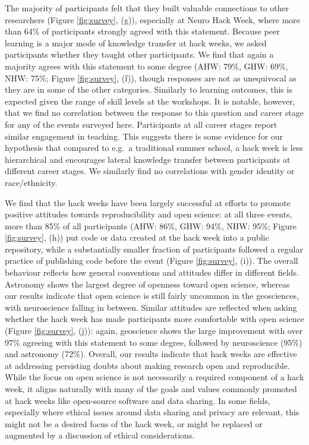The majority of participants felt that they built valuable connections to other researchers (Figure \ref{fig:survey}, (g)), especially at Neuro Hack Week, where more than 64\% of participants strongly agreed with this statement.
Because peer learning is a major mode of knowledge transfer at hack weeks, we asked participants whether they taught other participants.
We find that again a majority agrees with this statement to some degree (AHW: 79\%, GHW: 69\%, NHW: 75\%; Figure \ref{fig:survey}, (f)), though responses are not as unequivocal as they are in some of the other categories.
Similarly to learning outcomes, this is expected given the range of skill levels at the workshops. It is notable, however, that we find no correlation between the response to this question and career stage for any of the events surveyed here. Participants at all career stages report similar engagement in teaching. This suggests there is some evidence for our hypothesis that compared to e.g.\ a traditional summer school, a hack week is less hierarchical and encourages lateral knowledge transfer between participants at different career stages.  We similarly find no correlations with gender identity or race/ethnicity.

We find that the hack weeks have been largely successful at efforts to promote positive attitudes towards reproducibility and open science: at all three events, more than 85\% of all participants (AHW: 86\%, GHW: 94\%, NHW: 95\%; Figure \ref{fig:survey}, (h)) put code or data created at the hack week into a public repository, while a substantially smaller fraction of participants followed a regular practice of publishing code before the event (Figure \ref{fig:survey}, (i)).
The overall behaviour reflects how general conventions and attitudes differ in different fields.
Astronomy shows the largest degree of openness toward open science, whereas our results indicate that open science is still fairly uncommon in the geosciences, with neuroscience falling in between.
Similar attitudes are reflected when asking whether the hack week has made participants more comfortable with open science (Figure \ref{fig:survey}, (j)): again, geoscience shows the large improvement with over 97\% agreeing with this statement to some degree, followed by neuroscience (95\%) and astronomy (72\%).
Overall, our results indicate that hack weeks are effective at addressing persisting doubts about making research open and reproducible. While the focus on open science is not necessarily a required component of a hack week, it aligns naturally with many of the goals and values commonly promoted at hack weeks like open-source software and data sharing. In some fields, especially where ethical issues around data sharing and privacy are relevant, this might not be a desired focus of the hack week, or might be replaced or augmented by a discussion of ethical considerations.

